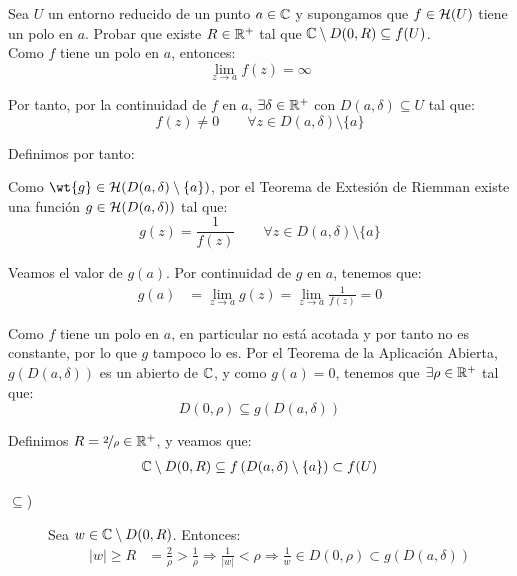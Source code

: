 \begin{ejercicio}
    Sea $U$ un entorno reducido de un punto $a \in \mathbb{C}$ y supongamos que $f \in \mathcal{H}(U)$ tiene un polo en $a$. Probar que existe $R\in \mathbb{R}^+$ tal que $\mathbb{C} \setminus D(0,R) \subseteq f(U)$.\\

    Como $f$ tiene un polo en $a$, entonces:
    \begin{equation*}
        \lim_{z \to a} f(z) = \infty
    \end{equation*}

    Por tanto, por la continuidad de $f$ en $a$, $\exists \delta\in \mathbb{R}^+$ con $D(a, \delta) \subseteq U$ tal que:
    \begin{equation*}
        f(z)\neq 0 \qquad \forall z \in D(a, \delta) \setminus \{a\}
    \end{equation*}

    Definimos por tanto:

    Como $\wt{g}\in \cc{H}(D(a, \delta) \setminus \{a\})$, por el Teorema de Extesión de Riemman existe una función $g \in \mathcal{H}(D(a, \delta))$ tal que:
    \begin{equation*}
        g(z) = \frac{1}{f(z)}\qquad \forall z \in D(a, \delta) \setminus \{a\}
    \end{equation*}

    Veamos el valor de $g(a)$. Por continuidad de $g$ en $a$, tenemos que:
    \begin{align*}
        g(a) &= \lim_{z \to a} g(z) = \lim_{z \to a} \frac{1}{f(z)} = 0
    \end{align*}

    Como $f$ tiene un polo en $a$, en particular no está acotada y por tanto no es constante, por lo que $g$ tampoco lo es. Por el Teorema de la Aplicación Abierta, $g(D(a, \delta))$ es un abierto de $\mathbb{C}$, y como $g(a) = 0$, tenemos que $\exists \rho \in \mathbb{R}^+$ tal que:
    \begin{equation*}
        D(0, \rho) \subseteq g(D(a, \delta))
    \end{equation*}

    Definimos $R= \nicefrac{2}{\rho} \in \mathbb{R}^+$, y veamos que:
    \begin{align*}
        \mathbb{C} \setminus D(0, R) \subseteq f\left(D(a, \delta)\setminus \{a\}\right)\subset f(U)
    \end{align*}
    \begin{description}
        \item[$\subseteq$)] Sea $w \in \mathbb{C} \setminus D(0, R)$. Entonces:
        \begin{align*}
            |w| \geq R &= \frac{2}{\rho}>\frac{1}{\rho}
            \Longrightarrow \frac{1}{|w|} < \rho
            \Longrightarrow \frac{1}{w}\in D(0, \rho)\subset g(D(a, \delta))
        \end{align*}


\end{description}
\end{ejercicio}
